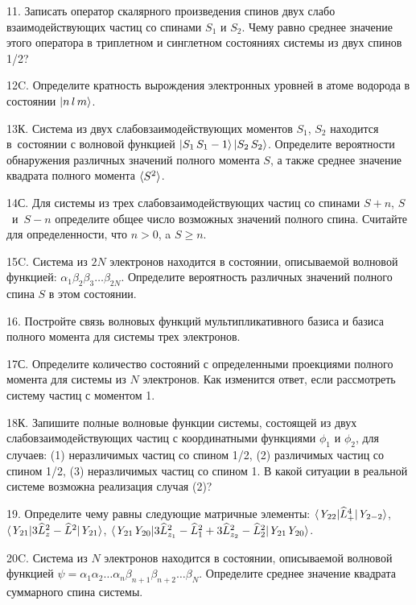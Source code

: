 \par
11. Записать оператор скалярного произведения спинов двух слабо взаимодействующих частиц со спинами $S_1$ и $S_2$. Чему равно среднее значение этого оператора в триплетном и синглетном состояниях системы из двух спинов 1/2?
\par
12C. Определите кратность вырождения электронных уровней в атоме водорода в состоянии $\ket{n\,l\,m} $.
\par
13К. Система из двух слабовзаимодействующих моментов $S_1$, $S_2$ находится в~состоянии с волновой функцией $\ket{S_1\,S_1-1}\ket{S_2\,S_2}$. Определите вероятности обнаружения различных значений полного момента $S$, а также среднее значение квадрата полного момента $\braket{S^2}$.
\par
14С. Для системы из трех слабовзаимодействующих частиц со спинами $S + n$, $S$~и~$S - n$ определите общее число возможных значений полного спина. Считайте для определенности, что $n > 0$, a $S \geq n$.
\par
15C. Система из $2N$ электронов находится в состоянии, описываемой волновой функцией: $\alpha_1\beta_2\beta_3 \ldots \beta_{2N}$. Определите вероятность различных значений полного спина $S$ в этом состоянии.
\par
16. Постройте связь волновых функций мультипликативного базиса и базиса полного момента для системы трех электронов.
\par
17С. Определите количество состояний с определенными проекциями полного момента для системы из $N$ электронов. Как изменится ответ, если рассмотреть систему частиц с моментом 1.
\par
18К. Запишите полные волновые функции системы, состоящей из двух слабовзаимодействующих частиц с координатными функциями $\phi_1$ и $\phi_2$, для случаев: (1) неразличимых частиц со спином 1/2, (2) различимых частиц со спином 1/2, (3) неразличимых частиц со спином 1. В какой ситуации в реальной системе возможна реализация случая (2)?
\par
19. Определите чему равны следующие матричные элементы: $\braket{\textit{Y}_{22}|\widehat L^4_+|\textit{Y}_{2-2}}$, $\braket{\textit{Y}_{21}|3\widehat L_{z}^2- \widehat L^2|\textit{Y}_{21}}$, $\braket{\textit{Y}_{21}\textit{Y}_{20}|3 \widehat L_{z_1}^2- \widehat L_1^2+3 \widehat L_{z_2}^2- \widehat L_2^2|\textit{Y}_{21}\textit{Y}_{20}}$.
\par
20C. Система из $N$ электронов находится в состоянии, описываемой волновой функцией $\psi=\alpha_1\alpha_2 \ldots \alpha_n\beta_{n+1}\beta_{n+2} \ldots \beta_{N}$. Определите среднее значение квадрата суммарного спина системы.
\par
